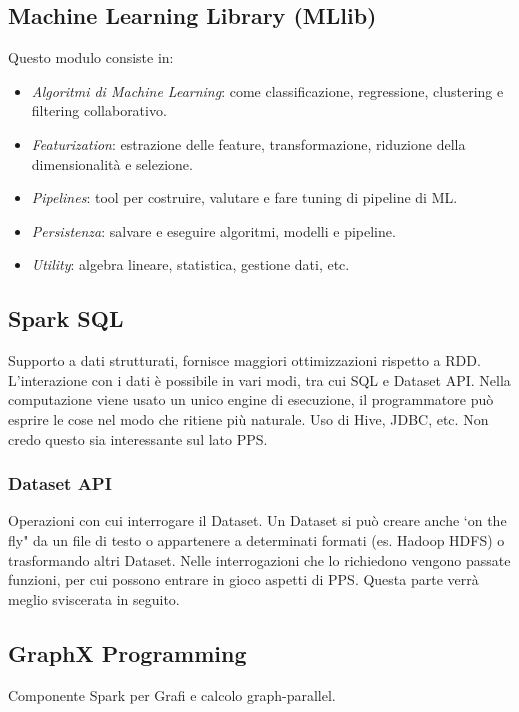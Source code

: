 \documentclass[12pt,italian]{article}
\begin{document}
\subsection{Machine Learning Library (MLlib)}
Questo modulo consiste in:
\begin{itemize}
	\item \textit{Algoritmi di Machine Learning}: come classificazione, regressione, clustering e filtering collaborativo.
	\item \textit{Featurization}: estrazione delle feature, transformazione, riduzione della dimensionalità e selezione.
	\item \textit{Pipelines}: tool per costruire, valutare e fare tuning di pipeline di ML.
	\item \textit{Persistenza}: salvare e eseguire algoritmi, modelli e pipeline.
	\item \textit{Utility}: algebra lineare, statistica, gestione dati, etc.
\end{itemize}
\subsection{Spark SQL}
Supporto a dati strutturati, fornisce maggiori ottimizzazioni rispetto a RDD. L'interazione con i dati è possibile in vari modi, tra cui SQL e Dataset API.
Nella computazione viene usato un unico engine di esecuzione, il programmatore può esprire le cose nel modo che ritiene più naturale. Uso di Hive, JDBC, etc. 
Non credo questo sia interessante sul lato PPS. %
\subsubsection{Dataset API}
Operazioni con cui interrogare il Dataset. 
Un Dataset si può creare anche `on the fly" da un file di testo o appartenere a determinati formati (es. Hadoop HDFS) o trasformando altri Dataset.
Nelle interrogazioni che lo richiedono vengono passate funzioni, per cui possono entrare in gioco aspetti di PPS. Questa parte verrà meglio sviscerata in seguito. %
\subsection{GraphX Programming}
Componente Spark per Grafi e calcolo graph-parallel.
\end{document}
